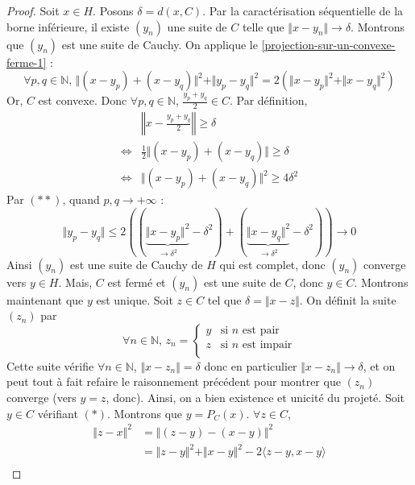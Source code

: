   \begin{proof}
    Soit $x \in H$. Posons $\delta = d(x, C)$. Par la caractérisation séquentielle de la borne inférieure, il existe $(y_n)$ une suite de $C$ telle que $\Vert x - y_n \Vert \longrightarrow \delta$. Montrons que $(y_n)$ est une suite de Cauchy. On applique le \cref{projection-sur-un-convexe-ferme-1} :
    \[ \forall p, q \in \mathbb{N}, \, \Vert (x - y_p) + (x - y_q) \Vert^2 + \Vert y_p - y_q \Vert^2 = 2(\Vert x - y_p \Vert^2 + \Vert x - y_q \Vert^2) \tag{$**$} \]
    Or, $C$ est convexe. Donc $\forall p, q \in \mathbb{N}$, $\frac{y_p + y_q}{2} \in C$.
    Par définition,
    \begin{align*}
      & \left\Vert x - \frac{y_p + y_q}{2} \right\Vert \geq \delta \\
      \iff& \frac{1}{2} \Vert (x - y_p) + (x - y_q) \Vert \geq \delta \\
      \iff& \Vert (x - y_p) + (x - y_q) \Vert^2 \geq 4 \delta^2
    \end{align*}
    Par $(**)$, quand $p, q \longrightarrow +\infty$ :
    \[ \Vert y_p - y_q \Vert \leq 2((\underbrace{\Vert x - y_p \Vert^2}_{\longrightarrow \delta^2} - \delta^2) + (\underbrace{\Vert x - y_q \Vert^2}_{\longrightarrow \delta^2} - \delta^2)) \longrightarrow 0 \]
    Ainsi $(y_n)$ est une suite de Cauchy de $H$ qui est complet, donc $(y_n)$ converge vers $y \in H$. Mais, $C$ est fermé et $(y_n)$ est une suite de $C$, donc $y \in C$.
    \newpar
    Montrons maintenant que $y$ est unique. Soit $z \in C$ tel que $\delta = \Vert x - z \Vert$. On définit la suite $(z_n)$ par
    \[ \forall n \in \mathbb{N}, \, z_n =
    \begin{cases}
      y &\text{si } n \text{ est pair} \\
      z &\text{si } n \text{ est impair} \\
    \end{cases}
    \]
    Cette suite vérifie $\forall n \in \mathbb{N}$, $\Vert x - z_n \Vert = \delta$ donc en particulier $\Vert x - z_n \Vert \longrightarrow \delta$, et on peut tout à fait refaire le raisonnement précédent pour montrer que $(z_n)$ converge (vers $y = z$, donc). Ainsi, on a bien existence et unicité du projeté.
    \newpar
    Soit $y \in C$ vérifiant $(*)$. Montrons que $y = P_C(x)$. $\forall z \in C$,
    \begin{align*}
      \Vert z - x \Vert^2 &= \Vert (z - y) - (x - y) \Vert^2 \\
      &= \Vert z - y \Vert^2 + \Vert x - y \Vert^2 - 2 \langle z - y, x - y \rangle \\

\end{align*}
\end{proof}
